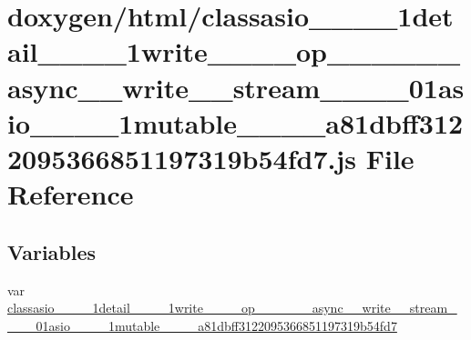 \hypertarget{classasio____1____1detail____1____1write________op____3____01____async____write____stream____00_419518212b11ca029c5e215caf3b178a}{}\section{doxygen/html/classasio\+\_\+\+\_\+\_\+\+\_\+1detail\+\_\+\+\_\+\_\+\+\_\+1write\+\_\+\+\_\+\+\_\+\+\_\+op\+\_\+\+\_\+\_\+\+\_\+\_\+\+\_\+async\+\_\+\+\_\+write\+\_\+\+\_\+stream\+\_\+\+\_\+\_\+\+\_\+01asio\+\_\+\+\_\+\_\+\+\_\+1mutable\+\_\+\+\_\+\+\_\+\+\_\+a81dbff3122095366851197319b54fd7.js File Reference}
\label{classasio____1____1detail____1____1write________op____3____01____async____write____stream____00_419518212b11ca029c5e215caf3b178a}
\subsection*{Variables}
\begin{DoxyCompactItemize}
\item 
var \hyperlink{classasio____1____1detail____1____1write________op____3____01____async____write____stream____00_419518212b11ca029c5e215caf3b178a_a45b8dea1e0f016e85ea9cbe40d288846}{classasio\+\_\+\+\_\+\_\+\+\_\+1detail\+\_\+\+\_\+\_\+\+\_\+1write\+\_\+\+\_\+\+\_\+\+\_\+op\+\_\+\+\_\+\_\+\+\_\+\_\+\+\_\+async\+\_\+\+\_\+write\+\_\+\+\_\+stream\+\_\+\+\_\+\_\+\+\_\+01asio\+\_\+\+\_\+\_\+\+\_\+1mutable\+\_\+\+\_\+\+\_\+\+\_\+a81dbff3122095366851197319b54fd7}
\end{DoxyCompactItemize}


